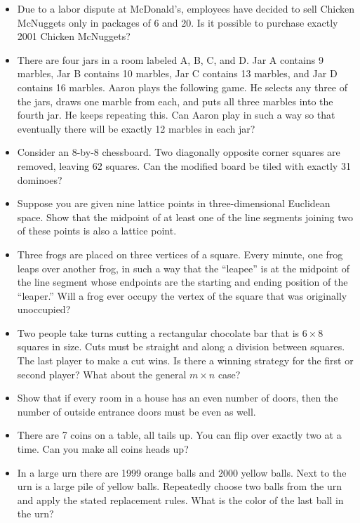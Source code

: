 \documentclass[12pt]{article}
\begin{document}
\begin{itemize}
  \item Due to a labor dispute at McDonald's, employees have decided to sell Chicken McNuggets only in packages of 6 and 20. Is it possible to purchase exactly 2001 Chicken McNuggets?

  \item There are four jars in a room labeled A, B, C, and D. Jar A contains 9 marbles, Jar B contains 10 marbles, Jar C contains 13 marbles, and Jar D contains 16 marbles. Aaron plays the following game. He selects any three of the jars, draws one marble from each, and puts all three marbles into the fourth jar. He keeps repeating this. Can Aaron play in such a way so that eventually there will be exactly 12 marbles in each jar?

  \item Consider an 8-by-8 chessboard. Two diagonally opposite corner squares are removed, leaving 62 squares. Can the modified board be tiled with exactly 31 dominoes?

  \item Suppose you are given nine lattice points in three-dimensional Euclidean space. Show that the midpoint of at least one of the line segments joining two of these points is also a lattice point.

  \item Three frogs are placed on three vertices of a square. Every minute, one frog leaps over another frog, in such a way that the ``leapee'' is at the midpoint of the line segment whose endpoints are the starting and ending position of the ``leaper.'' Will a frog ever occupy the vertex of the square that was originally unoccupied?

  \item Two people take turns cutting a rectangular chocolate bar that is $6 \times 8$ squares in size. Cuts must be straight and along a division between squares. The last player to make a cut wins. Is there a winning strategy for the first or second player? What about the general $m \times n$ case?

  \item Show that if every room in a house has an even number of doors, then the number of outside entrance doors must be even as well.

  \item There are 7 coins on a table, all tails up. You can flip over exactly two at a time. Can you make all coins heads up?

  \item In a large urn there are 1999 orange balls and 2000 yellow balls. Next to the urn is a large pile of yellow balls. Repeatedly choose two balls from the urn and apply the stated replacement rules. What is the color of the last ball in the urn?


\end{itemize}
\end{document}
